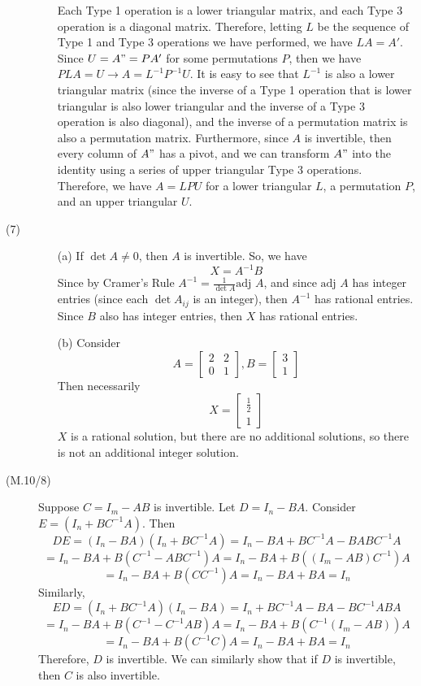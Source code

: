 \documentclass[openany]{book}
\begin{document}
\begin{description}
\begin{itemize}
Each Type 1 operation is a lower triangular matrix, and each Type 3 operation is a diagonal matrix. Therefore, letting $L$ be the sequence of Type 1 and Type 3 operations we have performed, we have $LA = A'$. Since $U = A" = PA'$ for some permutations $P$, then we have $PLA = U \rightarrow A = L^{-1}P^{-1}U$. It is easy to see that $L^{-1}$ is also a lower triangular matrix (since the inverse of a Type 1 operation that is lower triangular is also lower triangular and the inverse of a Type 3 operation is also diagonal), and the inverse of a permutation matrix is also a permutation matrix. Furthermore, since $A$ is invertible, then every column of $A"$ has a pivot, and we can transform $A"$ into the identity using a series of upper triangular Type 3 operations. Therefore, we have $A = LPU$ for a lower triangular $L$, a permutation $P$, and an upper triangular $U$.
\end{itemize}
\item[(7)]
\begin{itemize}
\item[(a)]
If $\det A \neq 0$, then $A$ is invertible. So, we have
$$X = A^{-1}B$$
Since by Cramer's Rule $A^{-1} = \frac{1}{\det A}\text{adj }A$, and since $\text{adj }A$ has integer entries (since each $\det A_{ij}$ is an integer), then $A^{-1}$ has rational entries. Since $B$ also has integer entries, then $X$ has rational entries.
\item[(b)]
Consider
$$A = \begin{bmatrix}
2 & 2 \\
0 & 1
\end{bmatrix}, B = \begin{bmatrix}
3 \\
1
\end{bmatrix}$$
Then necessarily
$$X = \begin{bmatrix}
\frac{1}{2} \\
1
\end{bmatrix}$$
$X$ is a rational solution, but there are no additional solutions, so there is not an additional integer solution.
\end{itemize}
\item[(M.10/8)]
Suppose $C = I_m - AB$ is invertible. Let $D = I_n - BA$. Consider $E = (I_n + BC^{-1}A)$. Then
$$DE = (I_n - BA)(I_n + BC^{-1}A) = I_n - BA + BC^{-1}A - BABC^{-1}A$$
$$= I_n - BA + B(C^{-1} - ABC^{-1})A = I_n - BA + B((I_m - AB)C^{-1})A$$
$$= I_n - BA + B(CC^{-1})A = I_n - BA + BA = I_n$$
Similarly,
$$ED = (I_n + BC^{-1}A)(I_n - BA) = I_n + BC^{-1}A - BA - BC^{-1}ABA$$
$$= I_n - BA + B(C^{-1} - C^{-1}AB)A = I_n - BA + B(C^{-1}(I_m - AB))A$$
$$= I_n - BA + B(C^{-1}C)A = I_n - BA + BA = I_n$$
Therefore, $D$ is invertible. We can similarly show that if $D$ is invertible, then $C$ is also invertible.
\end{description}
\end{document}
